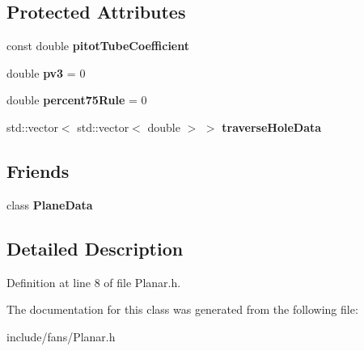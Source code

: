 \subsection*{Protected Attributes}
\begin{DoxyCompactItemize}
\item 
\mbox{\label{class_velocity_pressure_traverse_data_a5f0d183ca647bc7eef7f7c7a44a9c23e}} 
const double {\bfseries pitot\+Tube\+Coefficient}
\item 
\mbox{\label{class_velocity_pressure_traverse_data_ae8ed6cb6fa7aeec774383671c38bc21b}} 
double {\bfseries pv3} = 0
\item 
\mbox{\label{class_velocity_pressure_traverse_data_aaae013760883326c1c15bc0e2a27cd34}} 
double {\bfseries percent75\+Rule} = 0
\item 
\mbox{\label{class_velocity_pressure_traverse_data_a02b06c3211e4fb15fdba68127a9855a8}} 
std\+::vector$<$ std\+::vector$<$ double $>$ $>$ {\bfseries traverse\+Hole\+Data}
\end{DoxyCompactItemize}
\subsection*{Friends}
\begin{DoxyCompactItemize}
\item 
\mbox{\label{class_velocity_pressure_traverse_data_a28ff438eefb65e97bddb4051dd0a0112}} 
class {\bfseries Plane\+Data}
\end{DoxyCompactItemize}


\subsection{Detailed Description}


Definition at line 8 of file Planar.\+h.



The documentation for this class was generated from the following file\+:\begin{DoxyCompactItemize}
\item 
include/fans/Planar.\+h\end{DoxyCompactItemize}
